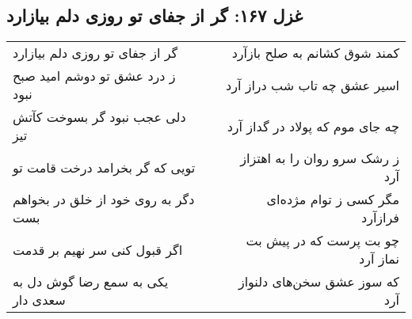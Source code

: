 \begin{center}
\section*{غزل ۱۶۷: گر از جفای تو روزی دلم بیازارد}
\label{sec:167}
\begin{longtable}{l p{0.5cm} r}
گر از جفای تو روزی دلم بیازارد
&&
کمند شوق کشانم به صلح بازآرد
\\
ز درد عشق تو دوشم امید صبح نبود
&&
اسیر عشق چه تاب شب دراز آرد
\\
دلی عجب نبود گر بسوخت کآتش تیز
&&
چه جای موم که پولاد در گداز آرد
\\
تویی که گر بخرامد درخت قامت تو
&&
ز رشک سرو روان را به اهتزاز آرد
\\
دگر به روی خود از خلق در بخواهم بست
&&
مگر کسی ز توام مژده‌ای فرازآرد
\\
اگر قبول کنی سر نهیم بر قدمت
&&
چو بت پرست که در پیش بت نماز آرد
\\
یکی به سمع رضا گوش دل به سعدی دار
&&
که سوز عشق سخن‌های دلنواز آرد
\\
\end{longtable}
\end{center}
